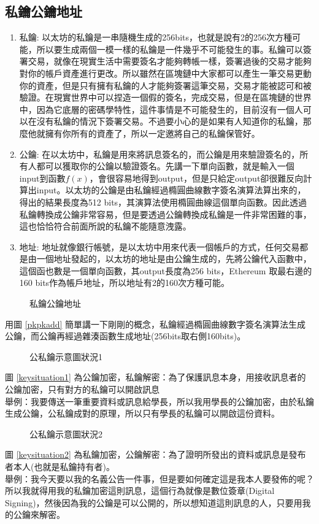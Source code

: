 \documentclass[12pt, a4paper]{article}
\begin{document}
\subsection{私鑰公鑰地址}
\begin{enumerate}
\item 私鑰:
以太坊的私鑰是一串隨機生成的256bits，也就是說有2的256次方種可能，所以要生成兩個一模一樣的私鑰是一件幾乎不可能發生的事。私鑰可以簽署交易，就像在現實生活中需要簽名才能夠轉帳一樣，簽署過後的交易才能夠對你的帳戶資產進行更改。所以雖然在區塊鏈中大家都可以產生一筆交易更動你的資產，但是只有擁有私鑰的人才能夠簽署這筆交易，交易才能被認可和被驗證。在現實世界中可以捏造一個假的簽名，完成交易，但是在區塊鏈的世界中，因為它底層的密碼學特性，這件事情是不可能發生的，目前沒有一個人可以在沒有私鑰的情況下簽署交易。不過要小心的是如果有人知道你的私鑰，那麼他就擁有你所有的資產了，所以一定邀將自己的私鑰保管好。
\item 公鑰:
在以太坊中，私鑰是用來將訊息簽名的，而公鑰是用來驗證簽名的，所有人都可以獲取你的公鑰以驗證簽名。先講一下單向函數，就是輸入一個input到函數$f(x)$，會很容易地得到output，但是只給定output卻很難反向計算出input。以太坊的公鑰是由私鑰經過橢圓曲線數字簽名演算法算出來的，得出的結果長度為512 bits，其演算法使用橢圓曲線這個單向函數。因此透過私鑰轉換成公鑰非常容易，但是要透過公鑰轉換成私鑰是一件非常困難的事，這也恰恰符合前面所說的私鑰不能隨意洩露。
\item 地址:
地址就像銀行帳號，是以太坊中用來代表一個帳戶的方式，任何交易都是由一個地址發起的，以太坊的地址是由公鑰生成的，先將公鑰代入函數中，這個函也數是一個單向函數，其output長度為256 bits，Ethereum 取最右邊的160 bits作為帳戶地址，所以地址有2的160次方種可能。 
\end{enumerate}
\begin{figure}[h]
    \caption{私鑰公鑰地址}
    \label{fig:pkpkadd}
\end{figure}
用圖 \ref{pkpkadd} 簡單講一下剛剛的概念，私鑰經過橢圓曲線數字簽名演算法生成公鑰，而公鑰再經過雜湊函數生成地址(256bits取右側160bits)。
\begin{figure}[H]
    \caption{公私鑰示意圖狀況1}
    \label{fig:keysituation1}
\end{figure}
圖 \ref{keysituation1} 為公鑰加密，私鑰解密：為了保護訊息本身，用接收訊息者的公鑰加密，只有對方的私鑰可以開啟訊息\\
舉例：我要傳送一筆重要資料或訊息給學長，所以我用學長的公鑰加密，由於私鑰生成公鑰，公私鑰成對的原理，所以只有學長的私鑰可以開啟這份資料。\\
\begin{figure}[H]
    \caption{公私鑰示意圖狀況2}
    \label{fig:keysituation2}
\end{figure}
圖 \ref{keysituation2} 為私鑰加密，公鑰解密：為了證明所發出的資料或訊息是發布者本人(也就是私鑰持有者)。\\
舉例：我今天要以我的名義公告一件事，但是要如何確定這是我本人要發佈的呢？所以我就得用我的私鑰加密這則訊息，這個行為就像是數位簽章(Digital Signing)，然後因為我的公鑰是可以公開的，所以想知道這則訊息的人，只要用我的公鑰來解密。\\
\end{document}
